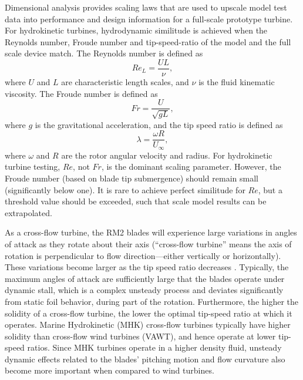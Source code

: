 \documentclass[10pt,letterpaper]{article}
\begin{document}
Dimensional analysis provides scaling laws that are used to upscale model test
data into performance and design information for a full-scale prototype turbine.
For hydrokinetic turbines, hydrodynamic similitude is achieved when the Reynolds
number, Froude number and tip-speed-ratio of the model and the full scale device
match. The Reynolds number is defined as
\begin{equation}
Re_L = \frac{UL}{\nu},
\label{eq-Re}
\end{equation}
where $U$ and $L$ are characteristic length scales, and $\nu$ is the fluid
kinematic viscosity. The Froude number is defined as
\begin{equation}
Fr = \frac{U}{\sqrt{gL}},
\label{eq-Fr}
\end{equation}
where $g$ is the gravitational acceleration, and the tip speed ratio is defined
as
\begin{equation}
\lambda=\frac{\omega R}{U_\infty},
\end{equation}
where $\omega$ and $R$ are the rotor angular velocity and radius.
For hydrokinetic turbine testing, $Re$, not $Fr$, is the dominant scaling
parameter. However, the Froude number (based on blade tip submergence) should
remain small (significantly below one). It is rare to achieve perfect similitude
for $Re$, but a threshold value should be exceeded, such that scale model
results can be extrapolated.

As a cross-flow turbine, the RM2 blades will experience large variations in
angles of attack as they rotate about their axis (``cross-flow turbine'' means
the axis of rotation is perpendicular to flow direction---either vertically or
horizontally). These variations become larger as the tip speed ratio decreases
\cite{Para2002}. Typically, the maximum angles of attack are sufficiently large
that the blades operate under dynamic stall, which is a complex unsteady process
and deviates significantly from static foil behavior, during part of the
rotation. Furthermore, the higher the solidity of a cross-flow turbine, the
lower the optimal tip-speed ratio at which it operates. Marine Hydrokinetic
(MHK) cross-flow turbines typically have higher solidity than cross-flow wind
turbines (VAWT), and hence operate at lower tip-speed ratios. Since MHK turbines
operate in a higher density fluid, unsteady dynamic effects related to the
blades' pitching motion and flow curvature also become more important when
compared to wind turbines.
\end{document}

